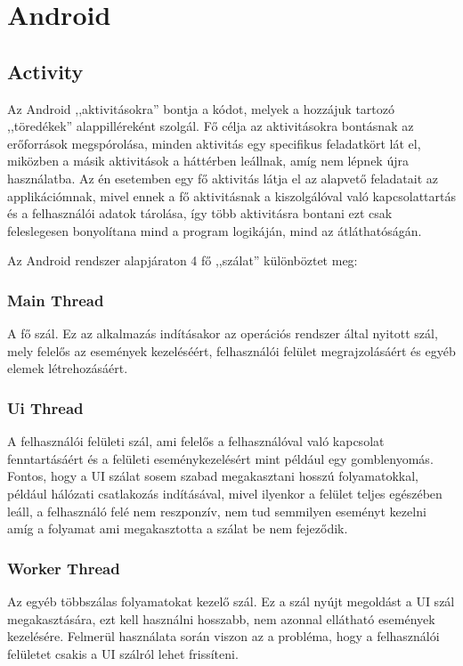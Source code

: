 \documentclass[
]{thesis-ekf}
\theoremstyle{definition}
\theoremstyle{remark}
\begin{document}
\section{Android}
\subsection{Activity}
Az Android ,,aktivitásokra'' bontja a kódot, melyek a hozzájuk tartozó ,,töredékek'' alappilléreként szolgál.
Fő célja az aktivitásokra bontásnak az erőforrások megspórolása, minden aktivitás egy specifikus feladatkört lát el, 
miközben a másik aktivitások a háttérben leállnak, amíg nem lépnek újra használatba. Az én esetemben egy fő aktivitás
látja el az alapvető feladatait az applikációmnak, mivel ennek a fő aktivitásnak a kiszolgálóval való kapcsolattartás és
a felhasználói adatok tárolása, így több aktivitásra bontani ezt csak feleslegesen bonyolítana mind a program logikáján,
mind az átláthatóságán.

Az Android rendszer alapjáraton 4 fő ,,szálat'' különböztet meg:
\subsubsection{Main Thread}
A fő szál. Ez az alkalmazás indításakor az operációs rendszer által nyitott szál, mely felelős az események kezeléséért, felhasználói felület megrajzolásáért és egyéb elemek létrehozásáért.
	
\subsubsection{Ui Thread}
A felhasználói felületi szál, ami felelős a felhasználóval való kapcsolat fenntartásáért 
és a felületi eseménykezelésért mint például egy gomblenyomás. Fontos, 
hogy a UI szálat sosem szabad megakasztani hosszú folyamatokkal, 
például hálózati csatlakozás indításával, mivel ilyenkor a felület teljes egészében leáll, 
a felhasználó felé nem reszponzív, nem tud semmilyen eseményt kezelni 
amíg a folyamat ami megakasztotta a szálat be nem fejeződik.
	
\subsubsection{Worker Thread}
Az egyéb többszálas folyamatokat kezelő szál. Ez a szál nyújt megoldást a UI szál megakasztására,
ezt kell használni hosszabb, nem azonnal ellátható események kezelésére. Felmerül használata során viszon az a
probléma, hogy a felhasználói felületet csakis a UI szálról lehet frissíteni. 
	
\end{document}
